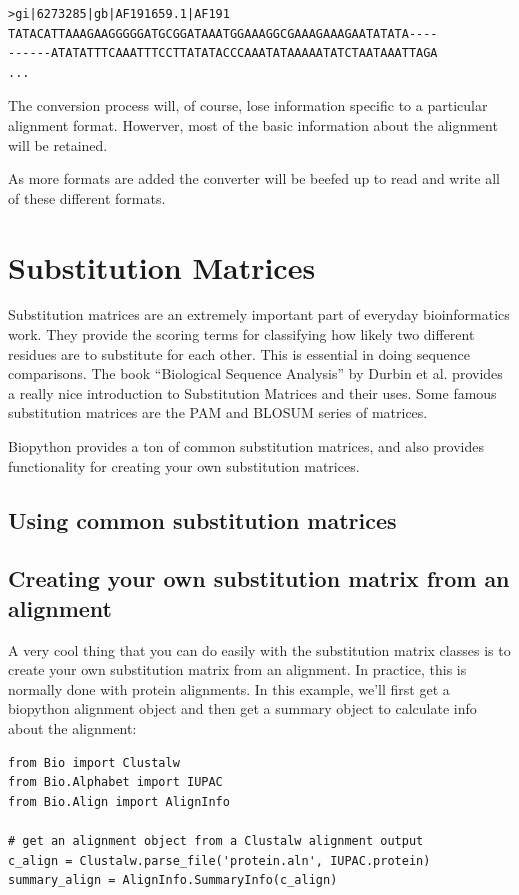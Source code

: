 \documentclass{report}
\begin{document}
\begin{verbatim}
>gi|6273285|gb|AF191659.1|AF191
TATACATTAAAGAAGGGGGATGCGGATAAATGGAAAGGCGAAAGAAAGAATATATA----
------ATATATTTCAAATTTCCTTATATACCCAAATATAAAAATATCTAATAAATTAGA
...
\end{verbatim}

The conversion process will, of course, lose information specific to a particular alignment format. Howerver, most of the basic information about the alignment will be retained.


As more formats are added the converter will be beefed up to read and write all of these different formats.

\section{Substitution Matrices}
\label{sec:sub_matrix}

Substitution matrices are an extremely important part of everyday bioinformatics work. They provide the scoring terms for classifying how likely two different residues are to substitute for each other. This is essential in doing sequence comparisons. The book ``Biological Sequence Analysis'' by Durbin et al. provides a really nice introduction to Substitution Matrices and their uses. Some famous substitution matrices are the PAM and BLOSUM series of matrices.


Biopython provides a ton of common substitution matrices, and also provides functionality for creating your own substitution matrices.

\subsection{Using common substitution matrices}

\subsection{Creating your own substitution matrix from an alignment}
\label{sec:subs_mat_ex}

A very cool thing that you can do easily with the substitution matrix
classes is to create your own substitution matrix from an
alignment. In practice, this is normally done with protein
alignments. In this example, we'll first get a biopython alignment
object and then get a summary object to calculate info about the
alignment:


\begin{verbatim}
from Bio import Clustalw
from Bio.Alphabet import IUPAC
from Bio.Align import AlignInfo

# get an alignment object from a Clustalw alignment output
c_align = Clustalw.parse_file('protein.aln', IUPAC.protein)
summary_align = AlignInfo.SummaryInfo(c_align)
\end{verbatim}
\end{document}
